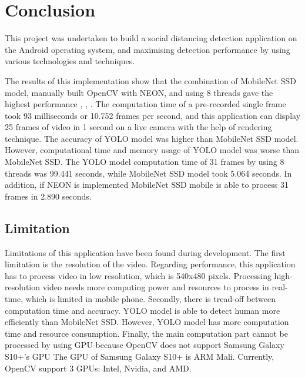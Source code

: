 \chapter{Conclusion}\label{conclusion}

    This project was undertaken to build a social distancing detection application on the Android operating system,
    and maximising detection performance by using various technologies and techniques.

    The results of this implementation show that the combination of MobileNet SSD model,
    manually built OpenCV with NEON, and using 8 threads gave the highest performance \cite{tensorflow2015-whitepaper}, \cite{opencv_library}, \cite{NEON-ARM}.
    The computation time of a pre-recorded single frame took 93 milliseconds or 10.752 frames per second,
    and this application can display 25 frames of video in 1 second on a live camera
    with the help of rendering technique.
    The accuracy of YOLO model was higher than MobileNet SSD model.
    However, computational time and memory usage of YOLO model was worse than MobileNet SSD.
    The YOLO model computation time of 31 frames by using 8 threads was 99.441 seconds,
    while MobileNet SSD model took 5.064 seconds.
    In addition, if NEON is implemented MobileNet SSD mobile is able to process 31 frames in 2.890 seconds.

    \section{Limitation}
        Limitations of this application have been found during development.
        The first limitation is the resolution of the video.
        Regarding performance, this application has to process video in low resolution,
        which is 540x480 pixels.
        Processing high-resolution video needs more computing power and resources to process in real-time,
        which is limited in mobile phone.
        Secondly, there is tread-off between computation time and accuracy.
        YOLO model is able to detect human more efficiently than MobileNet SSD.
        However, YOLO model has more computation time and resource consumption.
        Finally, the main computation part cannot be processed by using GPU
        because OpenCV does not support Samsung Galaxy S10+'s GPU
        The GPU of Samsung Galaxy S10+ is ARM Mali.
        Currently, OpenCV support 3 GPUs: Intel, Nvidia, and AMD.

